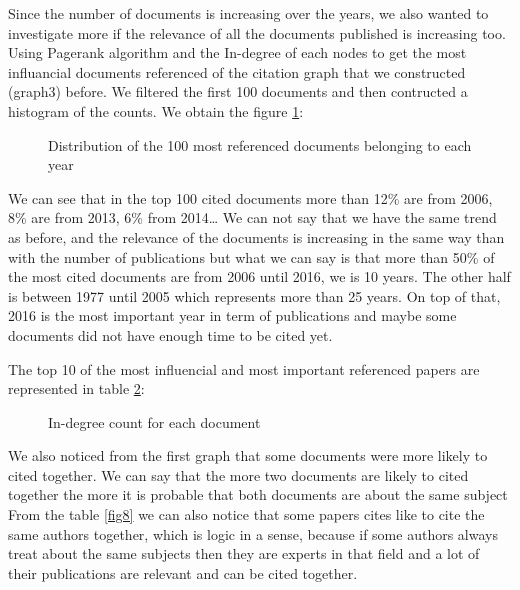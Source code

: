 \documentclass[journal,twocolumn]{IEEEtran}
\begin{document}
    Since the number of documents is increasing over the years, we also
wanted to investigate more if the relevance of all the documents
published is increasing too. Using Pagerank algorithm and the In-degree
of each nodes to get the most influancial documents referenced of the
citation graph that we constructed (graph3) before. We filtered the
first 100 documents and then contructed a histogram of the counts. We
obtain the figure \ref{fig7}:


    \begin{figure}
        \begin{center}\end{center}
        \caption{Distribution of the 100 most referenced documents belonging to each year}
        \label{fig7}
    \end{figure}
    
    We can see that in the top 100 cited documents more than 12\% are from
2006, 8\% are from 2013, 6\% from 2014\ldots{} We can not say that we
have the same trend as before, and the relevance of the documents is
increasing in the same way than with the number of publications but what
we can say is that more than 50\% of the most cited documents are from
2006 until 2016, we is 10 years. The other half is between 1977 until
2005 which represents more than 25 years. On top of that, 2016 is the
most important year in term of publications and maybe some documents did
not have enough time to be cited yet.

    The top 10 of the most influencial and most important referenced papers
are represented in table \ref{indegree}:


    \begin{figure}
        \begin{center}\end{center}
        \caption{In-degree count for each document}
        \label{indegree}
    \end{figure}
    
    We also noticed from the first graph that some documents were more
likely to cited together. We can say that the more two documents are
likely to cited together the more it is probable that both documents are
about the same subject From the table \ref{fig8} we can also notice that
some papers cites like to cite the same authors together, which is logic
in a sense, because if some authors always treat about the same subjects
then they are experts in that field and a lot of their publications are
relevant and can be cited together.
\end{document}
